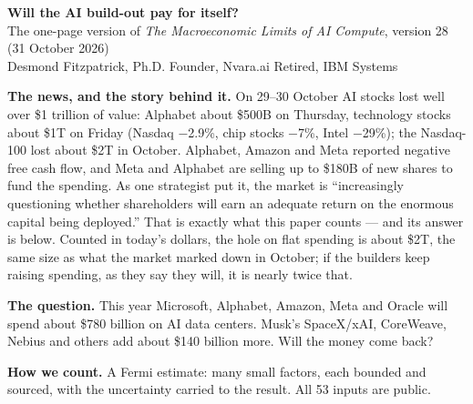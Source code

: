 \documentclass[11pt,letterpaper]{article}
\newcommand{\lead}[1]{{\sffamily\bfseries\color{lead}#1}}
\begin{document}
\begin{center}{\Large\bfseries\color{navy}Will the AI build-out pay for itself?}\\[2pt]
{\normalsize The one-page version of \emph{The Macroeconomic Limits of AI Compute}, version 28 (31 October 2026)}\\[2pt]
{\small Desmond Fitzpatrick, Ph.D. \quad Founder, Nvara.ai \quad Retired, IBM Systems}\end{center}

\colorbox{boxbg}{\begin{minipage}{0.97\textwidth}\vspace{3pt}
\textbf{The news, and the story behind it.} On 29--30 October AI stocks lost well over \$1 trillion of value: Alphabet about \$500B on Thursday, technology stocks about \$1T on Friday (Nasdaq $-$2.9\%, chip stocks $-$7\%, Intel $-$29\%); the Nasdaq-100 lost about \$2T in October. Alphabet, Amazon and Meta reported negative free cash flow, and Meta and Alphabet are selling up to \$180B of new shares to fund the spending. As one strategist put it, the market is ``increasingly questioning whether shareholders will earn an adequate return on the enormous capital being deployed.'' That is exactly what this paper counts --- and its answer is below. Counted in today's dollars, the hole on flat spending is about \$2T, the same size as what the market marked down in October; if the builders keep raising spending, as they say they will, it is nearly twice that.
\vspace{2pt}\end{minipage}}

\lead{The question.} This year Microsoft, Alphabet, Amazon, Meta and Oracle will spend about \$780 billion on AI data centers. Musk's SpaceX/xAI, CoreWeave, Nebius and others add about \$140 billion more. Will the money come back?

\lead{How we count.} A Fermi estimate: many small factors, each bounded and sourced, with the uncertainty carried to the result. All 53 inputs are public.
\end{document}
